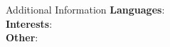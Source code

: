 \begin{rSection}{Additional Information}
  \textbf{Languages}: \\
  \textbf{Interests}: \\
  \textbf{Other}: \\
\end{rSection}
